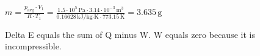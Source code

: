 \( m = \frac{p_{\text{avg}} \cdot V_1}{R \cdot T_1} = \frac{1.5 \cdot 10^5 \, \text{Pa} \cdot 3.14 \cdot 10^{-3} \, \text{m}^3}{0.16628 \, \text{kJ/kg·K} \cdot 773.15 \, \text{K}} = 3.635 \, \text{g} \)

Delta E equals the sum of Q minus W.  
W equals zero because it is incompressible.